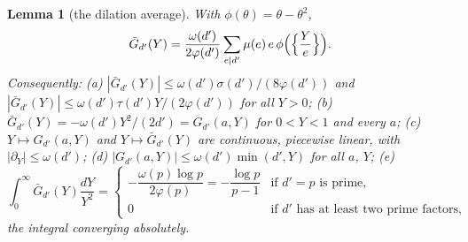 \documentclass[11pt,a4paper]{article}
\newtheorem{lemma}[theorem]{Lemma}
\theoremstyle{remark}\newtheorem{remark}[theorem]{Remark}
\begin{document}
\begin{lemma}[the dilation average]\label{lem:Gbar}
With $\phi(\theta)=\theta-\theta^2$,
\begin{equation}\label{eq:Gbar}
\bar G_{d'}(Y)=\frac{\omega(d')}{2\varphi(d')}\sum_{e\mid d'}\mu(e)\,e\,\phi\Bigl(\Bigl\{\frac Ye\Bigr\}\Bigr).
\end{equation}
Consequently: (a) $|\bar G_{d'}(Y)|\le\omega(d')\sigma(d')/(8\varphi(d'))$ and $|\bar G_{d'}(Y)|\le\omega(d')\tau(d')Y/(2\varphi(d'))$ for all $Y>0$;
(b) $\bar G_{d'}(Y)=-\omega(d')Y^2/(2d')=G_{d'}(a,Y)$ for $0<Y<1$ and every $a$;
(c) $Y\mapsto G_{d'}(a,Y)$ and $Y\mapsto\bar G_{d'}(Y)$ are continuous, piecewise linear, with $|\partial_Y|\le\omega(d')$;
(d) $|G_{d'}(a,Y)|\le\omega(d')\min(d',Y)$ for all $a$, $Y$;
(e)
\[
\int_0^\infty\bar G_{d'}(Y)\frac{dY}{Y^2}=\begin{cases}-\dfrac{\omega(p)\log p}{2\varphi(p)}=-\dfrac{\log p}{p-1}&\text{if }d'=p\text{ is prime},\\[2ex] 0&\text{if $d'$ has at least two prime factors,}\end{cases}
\]
the integral converging absolutely.
\end{lemma}
\end{document}

